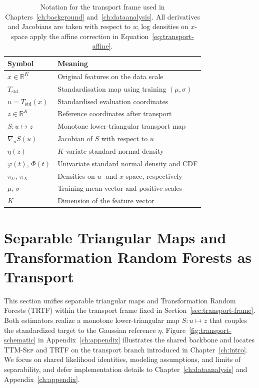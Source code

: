 \documentclass[11pt,a4paper,twoside]{book}\usepackage[]{graphicx}\usepackage[]{xcolor}
\begin{document}
\begin{table}[t]
  \centering
  \caption{Notation for the transport frame used in Chapters~\ref{ch:background} and~\ref{ch:dataanalysis}. All derivatives and Jacobians are taken with respect to $u$; log densities on $x$-space apply the affine correction in Equation~\eqref{eq:transport-affine}.}
  \label{tab:transport-notation}
  \begin{tabular}{ll}
    \hline
    Symbol & Meaning \\ 
    \hline
    $x \in \mathbb{R}^K$ & Original features on the data scale \\ 
    $T_{\mathrm{std}}$ & Standardisation map using training $(\mu,\sigma)$ \\ 
    $u = T_{\mathrm{std}}(x)$ & Standardised evaluation coordinates \\ 
    $z \in \mathbb{R}^K$ & Reference coordinates after transport \\ 
    $S:u\mapsto z$ & Monotone lower-triangular transport map \\ 
    $\nabla_u S(u)$ & Jacobian of $S$ with respect to $u$ \\ 
    $\eta(z)$ & $K$-variate standard normal density \\ 
    $\varphi(t)$, $\Phi(t)$ & Univariate standard normal density and CDF \\ 
    $\pi_U$, $\pi_X$ & Densities on $u$- and $x$-space, respectively \\ 
    $\mu$, $\sigma$ & Training mean vector and positive scales \\ 
    $K$ & Dimension of the feature vector \\ 
    \hline
  \end{tabular}
\end{table}

\section{Separable Triangular Maps and Transformation Random Forests as Transport}\label{sec:transport-separable}

This section unifies separable triangular maps and Transformation Random Forests (TRTF) within the transport frame fixed in Section~\ref{sec:transport-frame}. Both estimators realize a monotone lower-triangular map $S:u\mapsto z$ that couples the standardized target to the Gaussian reference $\eta$. Figure~\ref{fig:transport-schematic} in Appendix~\ref{ch:appendix} illustrates the shared backbone and locates \textsc{TTM-Sep} and \textsc{TRTF} on the transport branch introduced in Chapter~\ref{ch:intro}. We focus on shared likelihood identities, modeling assumptions, and limits of separability, and defer implementation details to Chapter~\ref{ch:dataanalysis} and Appendix~\ref{ch:appendix}.
\end{document}
